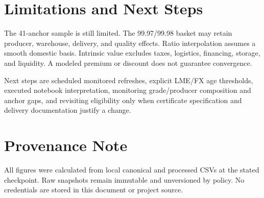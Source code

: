 \documentclass[11pt,a4paper]{article}
\begin{document}
\section{Limitations and Next Steps}
The 41-anchor sample is still limited. The 99.97/99.98 basket may retain producer, warehouse,
delivery, and quality effects. Ratio interpolation assumes a smooth domestic basis. Intrinsic
value excludes taxes, logistics, financing, storage, and liquidity. A modeled premium or discount
does not guarantee convergence.

Next steps are scheduled monitored refreshes, explicit LME/FX age thresholds, executed notebook
interpretation, monitoring grade/producer composition and anchor gaps, and revisiting eligibility
only when certificate specification and delivery documentation justify a change.

\section*{Provenance Note}
All figures were calculated from local canonical and processed CSVs at the stated checkpoint.
Raw snapshots remain immutable and unversioned by policy. No credentials are stored in this
document or project source.
\end{document}
